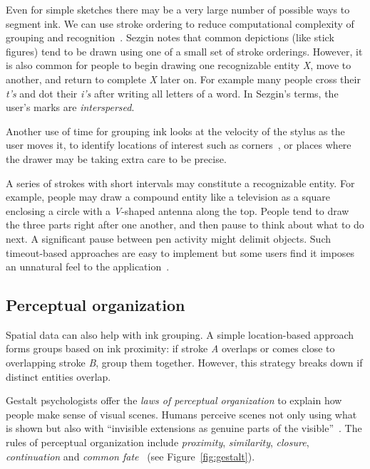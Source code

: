 Even for simple sketches there may be a very large number of possible
ways to segment ink. We can use stroke ordering to reduce
computational complexity of grouping and
recognition~\cite{sezgin-temporal}. Sezgin notes that common
depictions (like stick figures) tend to be drawn using one of a small
set of stroke orderings. However, it is also common for people to
begin drawing one recognizable entity \textit{X}, move to another, and
return to complete \textit{X} later on. For example many people cross
their \textit{t's} and dot their \textit{i's} after writing all
letters of a word. In Sezgin's terms, the user's marks
are \textit{interspersed}.

Another use of time for grouping ink looks at the velocity of the
stylus as the user moves it, to identify locations of interest such as
corners~\cite{sezgin-early-processing,davis-siggraph-tutorial}, or
places where the drawer may be taking extra care to be precise.

A series of strokes with short intervals may constitute a recognizable
entity. For example, people may draw a compound entity like a
television as a square enclosing a circle with a \textit{V}-shaped
antenna along the top. People tend to draw the three parts right after
one another, and then pause to think about what to do next. A
significant pause between pen activity might delimit objects. Such
timeout-based approaches are easy to implement but some users find it
imposes an unnatural feel to the
application~\cite{fonseca-fuzzy-recognition,zeleznik-sketch}.

\subsection{Perceptual organization}
\label{sec:recognition-perceptual-org}

Spatial data can also help with ink grouping. A simple location-based
approach forms groups based on ink proximity: if stroke \textit{A}
overlaps or comes close to overlapping stroke \textit{B}, group them
together. However, this strategy breaks down if distinct entities
overlap.

Gestalt psychologists offer the \textit{laws of perceptual
organization} to explain how people make sense of visual
scenes. Humans perceive scenes not only using what is shown but also
with ``invisible extensions as genuine parts of the
visible''~\cite{arnheim-visthink}. The rules of perceptual
organization include \textit{proximity},
\textit{similarity}, \textit{closure}, \textit{continuation} and 
\textit{common fate}~\cite{kanizsa-gestalt} (see Figure~\ref{fig:gestalt}). 

